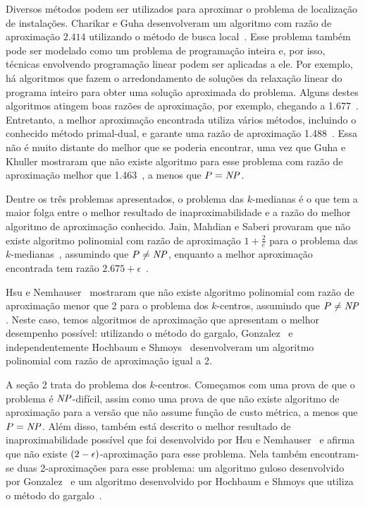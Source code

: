\documentclass[12pt]{article}
\begin{document}
Diversos métodos podem ser utilizados para aproximar o problema de localização de instalações. Charikar e Guha desenvolveram um algoritmo com razão de aproximação $2.414$ utilizando o método de busca local~\cite{Charikar&Guha'05}.  Esse problema também pode ser modelado como um problema de programação inteira e, por isso, técnicas envolvendo programação linear podem ser aplicadas a ele.  Por exemplo, há algoritmos que fazem o arredondamento de soluções da relaxação linear do programa inteiro para obter uma solução aproximada do problema.  Alguns destes algoritmos atingem boas razões de aproximação, por exemplo, chegando a 1.677~\cite{Byrka&Aardal'10}. Entretanto, a melhor aproximação encontrada utiliza vários métodos, incluindo o conhecido método primal-dual, e garante uma razão de aproximação 1.488~\cite{LI'13}. Essa não é muito distante do melhor que se poderia encontrar, uma vez que Guha e Khuller mostraram que não existe algoritmo para esse problema com razão de aproximação melhor que 1.463~\cite{GUHA1999228}, a menos que $P = \mathit{NP}$.


Dentre os três problemas apresentados, o problema das $k$-medianas é o que tem a maior folga entre o melhor resultado de inaproximabilidade e a razão do melhor algoritmo de aproximação conhecido. Jain, Mahdian e Saberi provaram que não existe algoritmo polinomial com razão de aproximação $1+ \frac{2}{e}$ para o problema das $k$-medianas~\cite{JMS'02}, assumindo que $P \neq \mathit{NP}$, enquanto a melhor aproximação encontrada tem razão $2.675 + \epsilon$~\cite{BPRST'17}.


Hsu e Nemhauser~\cite{HSU1979209} mostraram que não existe algoritmo polinomial com razão de aproximação menor que 2 para o problema dos $k$-centros, assumindo que $P\neq\mathit{NP}$. Neste caso, temos algoritmos de aproximação que apresentam o melhor desempenho possível: utilizando o método do gargalo, Gonzalez~\cite{GONZALEZ1985293} e independentemente Hochbaum e Shmoys~\cite{HochShmoys'85} desenvolveram um algoritmo polinomial com razão de aproximação igual a 2.

A seção 2 trata do problema dos $k$-centros. Começamos com uma prova de que o problema é $\mathit{NP}$-difícil, assim como uma prova de que não existe algoritmo de aproximação para a versão que não assume função de custo métrica, a menos que $P = \mathit{NP}$. Além disso, também está descrito o melhor resultado de inaproximabilidade possível que foi desenvolvido por Hsu e Nemhauser~\cite{HSU1979209} e afirma que não existe $(2-\epsilon)$-aproximação para esse problema. Nela também encontram-se duas 2-aproximações para esse problema: um algoritmo guloso desenvolvido por Gonzalez~\cite{GONZALEZ1985293} e um algoritmo desenvolvido por Hochbaum e Shmoys que utiliza o método do gargalo~\cite{HSBottle}.
\end{document}
